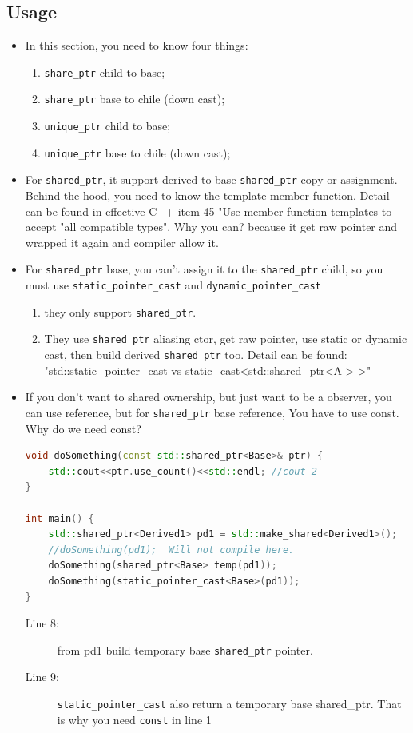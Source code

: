 \documentclass[a4paper,11pt,twoside]{book}
\begin{document}
\subsection{Usage}
\begin{itemize}
\item In this section, you need to know four things:
\begin{enumerate}
\item \texttt{share\_ptr} child to base;
\item \texttt{share\_ptr} base to chile (down cast);
\item \texttt{unique\_ptr} child to base;
\item \texttt{unique\_ptr} base to chile (down cast);
\end{enumerate}


		\item For \texttt{shared\_ptr}, it support derived to base \texttt{shared\_ptr} copy or assignment. Behind the hood, you need to know the template member function. Detail can be found in effective C++ item 45 "Use member function templates to accept "all compatible types". Why you can? because it get raw pointer and wrapped it again and compiler allow it.

		\item  For \texttt{shared\_ptr} base, you can't assign it to the \texttt{shared\_ptr} child, so you must use \texttt{static\_pointer\_cast} and \texttt{dynamic\_pointer\_cast}
		\begin{enumerate}
			\item they only support \texttt{shared\_ptr}.
			\item They use \texttt{shared\_ptr} aliasing ctor, get raw pointer, use static or dynamic cast, then build derived \texttt{shared\_ptr} too. Detail can be found: \\
			"std::static\_pointer\_cast vs static\_cast<std::shared\_ptr<A > >"
		\end{enumerate}

		\item If you don't want to shared ownership, but just want to be a observer, you can use reference, but for \texttt{shared\_ptr} base reference, You have to use const. Why do we need const?
	
\begin{lstlisting}[frame=single, language=c++, mathescape=true]
void doSomething(const std::shared_ptr<Base>& ptr) {
    std::cout<<ptr.use_count()<<std::endl; //cout 2
}

int main() {
	std::shared_ptr<Derived1> pd1 = std::make_shared<Derived1>();
	//doSomething(pd1);  Will not compile here.
	doSomething(shared_ptr<Base> temp(pd1));
	doSomething(static_pointer_cast<Base>(pd1));
}
\end{lstlisting}
	\begin{description}
	\item[Line 8:] from pd1 build temporary base \texttt{shared\_ptr} pointer.
	\item[Line 9:] \texttt{static\_pointer\_cast} also return a temporary base shared\_ptr. That is why you need \texttt{const} in line 1
\end{description}


\end{itemize}
\end{document}
